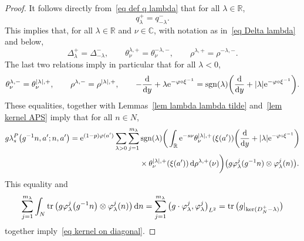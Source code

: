 \documentclass[pdftex]{sigma}%
\numberwithin{equation}{section}
\DeclareMathOperator{\tr}{tr}
\DeclareMathOperator{\sgn}{sgn}
\newcommand{\R}{\mathbb{R}}
\newcommand{\C}{\mathbb{C}}
\begin{document}
\begin{proof}
It follows directly from~\eqref{eq def q lambda} that for all $\lambda \in \R$,
\[
q^{+}_{\lambda} = q^{-}_{-\lambda}.
\]
This implies that, for all $\lambda \in \R$ and $\nu \in \C$, with notation as in~\eqref{eq Delta lambda} and below,
\[
\Delta^+_{\lambda}= \Delta^-_{-\lambda},\qquad
\theta^{\lambda, +}_{\nu} = \theta^{-\lambda,-}_{\nu},\qquad
\rho^{\lambda, +} = \rho^{-\lambda, -}.
\]
The last two relations imply in particular that for all $\lambda<0$,
\begin{equation*} %
\theta^{\lambda, -}_{\nu} = \theta^{|\lambda|, +}_{\nu},\qquad
\rho^{\lambda, -} = \rho^{|\lambda|, +},\qquad
 -\frac{\rm d}{{\rm d}y}+\lambda {\rm e}^{-\varphi \circ \xi^{-1}}= \sgn(\lambda) \bigg( \frac{\rm d}{{\rm d}y}+|\lambda| {\rm e}^{-\varphi \circ \xi^{-1}}\bigg).
\end{equation*}
These equalities, together with Lemmas~\ref{lem lambda lambda tilde} and~\ref{lem kernel APS} imply that for all $n \in N$,
\begin{align*}
g \lambda_s^{P}\big(g^{-1}n, a'; n, a'\big) = {\rm e}^{(1-p)\varphi(a')}
\sum_{\lambda >0} \sum_{j=1}^{m_{\lambda}} &\sgn(\lambda)
\bigg(\int_{\R}
{\rm e}^{-s\nu} \theta^{|\lambda|, +}_{\nu} (\xi(a')) \bigg( \frac{\rm d}{{\rm d}y}+|\lambda| {\rm e}^{-\varphi \circ \xi^{-1}}\bigg)
\\
& \times\theta^{|\lambda|, +}_{\nu} (\xi(a'))\, {\rm d}\rho^{\lambda, +}(\nu) \bigg)
\big(g \varphi_{\lambda}^j (g^{-1}n) \otimes \varphi_{\lambda}^j (n) \big).
\end{align*}
This equality and
\[
\sum_{j=1}^{m_{\lambda}}
\int_{N} \tr\big(g\varphi_{\lambda}^j\big(g^{-1}n\big) \otimes \varphi_{\lambda}^j(n)\big) \, {\rm d}n =
\sum_{j=1}^{m_{\lambda}} \big(g\cdot \varphi_{\lambda}^j, \varphi_{\lambda}^j\big)_{L^2} = \tr\big(g|_{\ker(D_N^+ - \lambda)}\big)
\]
together
imply~\eqref{eq kernel on diagonal}.
\end{proof}
\end{document}
